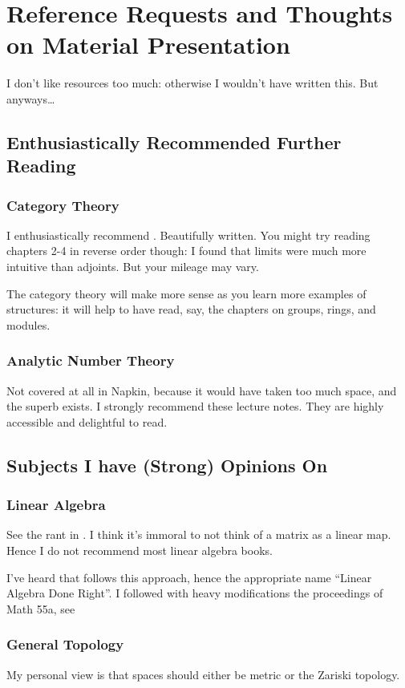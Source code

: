 \chapter{Reference Requests and Thoughts on Material Presentation}
I don't like resources too much: otherwise I wouldn't have written this.
But anyways\dots

\section{Enthusiastically Recommended Further Reading}
\subsection{Category Theory}
I enthusiastically recommend \cite{ref:msci}.
Beautifully written.
You might try reading chapters {2-4} in reverse order though:
I found that limits were much more intuitive than adjoints.
But your mileage may vary.

The category theory will make more sense as you learn
more examples of structures: it will help to have read,
say, the chapters on groups, rings, and modules.

\subsection{Analytic Number Theory}
Not covered at all in Napkin, because it would have taken too much
space, and the superb \cite{ref:analytic_NT} exists.
I strongly recommend these lecture notes.
They are highly accessible and delightful to read.

\section{Subjects I have (Strong) Opinions On}
\subsection{Linear Algebra}
See the rant in .
I think it's immoral to not think of a matrix as a linear map.
Hence I do not recommend most linear algebra books.

I've heard that \cite{ref:axler} follows this approach,
hence the appropriate name ``Linear Algebra Done Right''.
I followed with heavy modifications the proceedings of Math 55a,
see \cite{ref:55a}

\subsection{General Topology}
My personal view is that spaces should either be metric or the Zariski topology.


